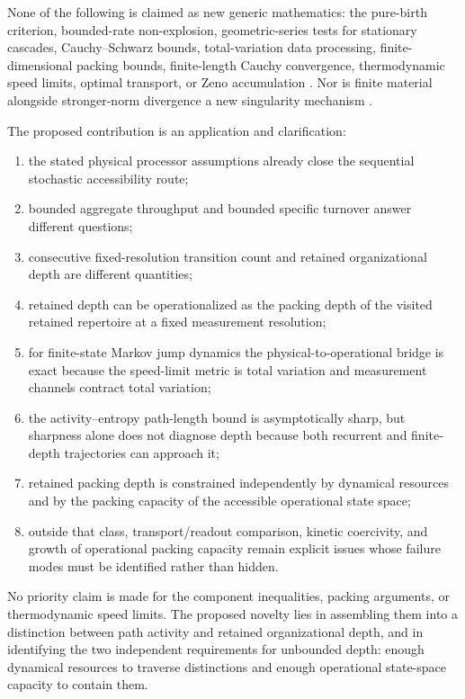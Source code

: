 \documentclass[11pt,a4paper]{article}
\theoremstyle{definition}
\numberwithin{equation}{section}
\begin{document}
None of the following is claimed as new generic mathematics:
the pure-birth criterion, bounded-rate non-explosion,
geometric-series tests for stationary cascades,
Cauchy--Schwarz bounds, total-variation data processing,
finite-dimensional packing bounds, finite-length Cauchy convergence,
thermodynamic speed limits, optimal transport, or Zeno accumulation
\cite{Feller1971,Shiraishi2018,Aurell2011,VuSaito2023,Nagayama2025,Zhang2001}.
Nor is finite material alongside stronger-norm divergence a new
singularity mechanism \cite{KatzPavlovic2005}.

The proposed contribution is an application and clarification:
\begin{enumerate}
\item the stated physical processor assumptions already close
      the sequential stochastic accessibility route;
\item bounded aggregate throughput and bounded specific turnover
      answer different questions;
\item consecutive fixed-resolution transition count and retained
      organizational depth are different quantities;
\item retained depth can be operationalized as the packing depth of the
      visited retained repertoire at a fixed measurement resolution;
\item for finite-state Markov jump dynamics the physical-to-operational
      bridge is exact because the speed-limit metric is total variation
      and measurement channels contract total variation;
\item the activity--entropy path-length bound is asymptotically sharp, but
      sharpness alone does not diagnose depth because both recurrent and
      finite-depth trajectories can approach it;
\item retained packing depth is constrained independently by dynamical
      resources and by the packing capacity of the accessible operational
      state space;
\item outside that class, transport/readout comparison, kinetic coercivity,
      and growth of operational packing capacity remain explicit issues whose
      failure modes must be identified rather than hidden.
\end{enumerate}

No priority claim is made for the component inequalities, packing arguments,
or thermodynamic speed limits. The proposed novelty lies in assembling them
into a distinction between path activity and retained organizational depth,
and in identifying the two independent requirements for unbounded depth:
enough dynamical resources to traverse distinctions and enough operational
state-space capacity to contain them.
\end{document}
